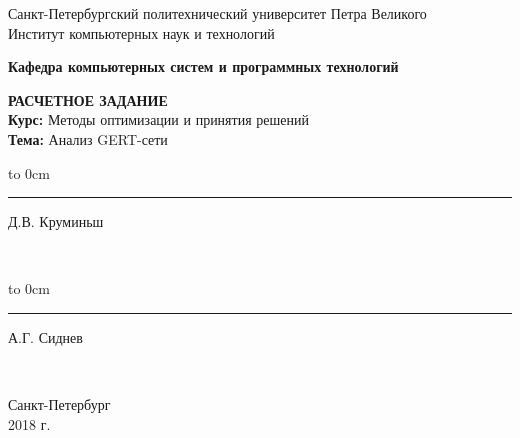 	\begin{titlepage}
		\begin{center}
			\large {Санкт-Петербургский политехнический университет Петра Великого\\
				Институт компьютерных наук и технологий}\\
		\end{center}
		\begin{center}
			\large\textbf {Кафедра компьютерных систем и программных технологий}
		\end{center}
		\vfill
		\begin{center}
			\large{\textbf{РАСЧЕТНОЕ ЗАДАНИЕ} \\
			\textbf{Курс: } Методы оптимизации и принятия решений\\
			\textbf{Тема: } Анализ GERT-сети}
		\end{center}
		
		\vfill
		
		\hfill\parbox{9 cm}{\hspace*{3cm}\hbox to 0cm{\raisebox{-1em}{\small(подпись)}}\hspace*{-0.8cm}\rule{3cm}{0.8pt} Д.В. Круминьш}\\[0.6cm]
		
		 \hfill\parbox{9 cm}{\hspace*{3cm}\hbox to 0cm{\raisebox{-1em}{\small(подпись)}}\hspace*{-0.8cm}\rule{3cm}{0.8pt} А.Г. Сиднев}\\[0.6cm]
		
		\vspace{\fill}
		\begin{center}
			Санкт-Петербург \\ 2018 г.
		\end{center}
	\end{titlepage}
\setcounter{page}{2}